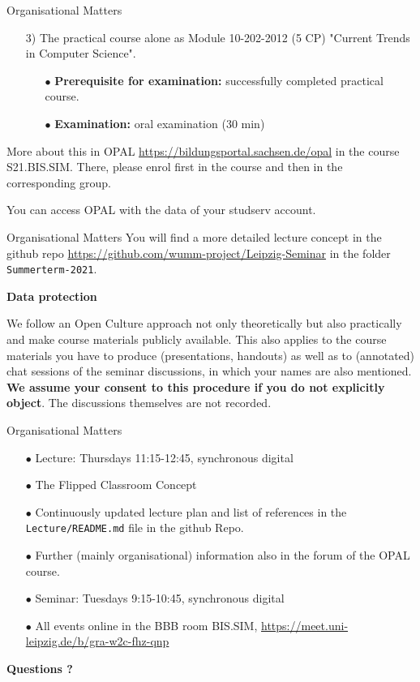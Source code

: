\documentclass{beamer}
\newcommand{\ueberschrift}[1]{\begin{center}\bf #1\end{center}}
\begin{document}
\begin{frame}{Organisational Matters}
\begin{itemize}
\item[3)] The practical course alone as Module 10-202-2012 (5 CP) "Current
  Trends in Computer Science".
  \begin{itemize}[noitemsep]
  \item[$\bullet$] \textbf{Prerequisite for examination:} successfully
    completed practical course.
  \item[$\bullet$] \textbf{Examination:} oral examination (30 min)
  \end{itemize}
\end{itemize}
More about this in OPAL \url{https://bildungsportal.sachsen.de/opal} in the
course S21.BIS.SIM.  There, please enrol first in the course and then in the
corresponding group.

You can access OPAL with the data of your studserv account.

\end{frame}

\begin{frame}{Organisational Matters}
You will find a more detailed lecture concept in the github repo
\url{https://github.com/wumm-project/Leipzig-Seminar} in the folder
\texttt{Summerterm-2021}.

\ueberschrift{Data protection}

We follow an Open Culture approach not only theoretically but also practically
and make course materials publicly available. This also applies to the course
materials you have to produce (presentations, handouts) as well as to
(annotated) chat sessions of the seminar discussions, in which your names are
also mentioned. \textbf{We assume your consent to this procedure if you do not
  explicitly object}. The discussions themselves are not recorded.

\end{frame}

\begin{frame}{Organisational Matters}

\begin{itemize}
\item[$\bullet$] Lecture: Thursdays 11:15-12:45, synchronous digital
\item[$\bullet$] The Flipped Classroom Concept
\item[$\bullet$] Continuously updated lecture plan and list of references in
  the \texttt{Lecture/README.md} file in the github Repo.  
\item[$\bullet$] Further (mainly organisational) information also in the forum
  of the OPAL course.
\item[$\bullet$] Seminar: Tuesdays 9:15-10:45, synchronous digital
\item[$\bullet$] All events online in the BBB room BIS.SIM,
  \url{https://meet.uni-leipzig.de/b/gra-w2c-fhz-qnp}
\end{itemize}
\begin{center}\LARGE\bf
  Questions ?
\end{center}

\end{frame}
\end{document}
